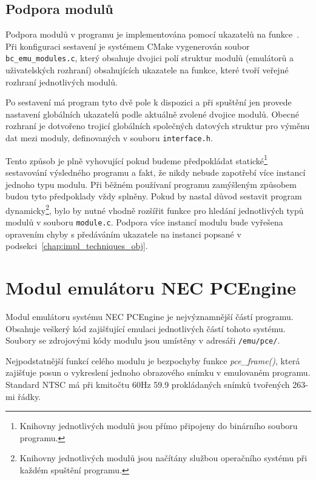 \subsection{Podpora modulů}

Podpora modulů v programu je implementována pomocí ukazatelů na
funkce~\cite{wwwCFuncPointer}. Při konfiguraci sestavení je systémem CMake
vygenerován soubor {\tt bc\_emu\_modules.c}, který obsahuje dvojici polí
struktur modulů (emulátorů a uživatelských rozhraní) obsahujících ukazatele na
funkce, které tvoří veřejné rozhraní jednotlivých modulů.

Po sestavení má program tyto dvě pole k dispozici a při spuštění jen provede
nastavení globálních ukazatelů podle aktuálně zvolené dvojice modulů. Obecné
rozhraní je dotvořeno trojicí globálních společných datových struktur pro
výměnu dat mezi moduly, definovaných v souboru {\tt interface.h}.

Tento způsob je plně vyhovující pokud budeme předpokládat
statické\footnote{Knihovny jednotlivých modulů jsou přímo připojeny do
binárního souboru programu.} sestavování výsledného programu a fakt, že nikdy
nebude zapotřebí více instancí jednoho typu modulu. Při běžném používaní
programu zamýšleným způsobem budou tyto předpoklady vždy splněny. Pokud by
nastal důvod sestavit program dynamicky\footnote{Knihovny jednotlivých modulů
jsou načítány službou operačního systému při každém spuštění programu.}, bylo by
nutné vhodně rozšířit funkce pro hledání jednotlivých typů modulů v souboru
{\tt module.c}. Podpora více instancí modulu bude vyřešena opravením chyby s
předáváním ukazatele na instanci popsané v
podsekci~\ref{chap:impl_techniques_obj}.


\section{Modul emulátoru NEC PCEngine}\label{chap:impl_pce}

Modul emulátoru systému NEC PCEngine je nejvýznamnější částí programu. Obsahuje
veškerý kód zajišťující emulaci jednotlivých částí tohoto systému. Soubory se
zdrojovými kódy modulu jsou umístěny v adresáři {\tt /emu/pce/}.

Nejpodstatnější funkcí celého modulu je bezpochyby funkce {\it pce\_frame()},
která zajišťuje posun o vykreslení jednoho obrazového snímku v emulovaném
programu. Standard NTSC má při kmitočtu 60Hz 59.9 prokládaných snímků tvořených
263-mi řádky.

